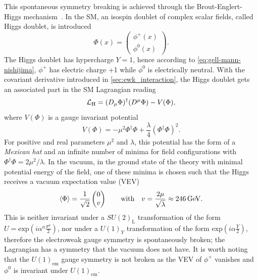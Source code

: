 This spontaneous symmetry breaking is achieved through the Brout-Englert-Higgs   mechanism~\cite{PhysRevLett.13.321,PhysRevLett.13.508,PhysRev.145.1156}. In the SM, an isospin doublet of complex scalar fields, called Higgs doublet, is introduced
\begin{equation}
	\Phi(x) = \begin{pmatrix}
		\phi^+(x) \\
		\phi^0(x)
	\end{pmatrix}.
\end{equation}
The Higgs doublet has hypercharge $Y=1$, hence according to \cref{eq:gell-mann-nishijima}, $\phi^+$ has electric charge +1 while $\phi^0$ is electrically neutral. With the covariant derivative introduced in \cref{sec:ewk_interaction}, the Higgs doublet gets an associated part in the SM Lagrangian reading
\begin{equation}
	\mathcal{L}_\mathrm{H} = (\mathop{}\!D_\mu\Phi)^\dagger(\mathop{}\!D^\mu\Phi) - V(\Phi),
\end{equation}
where $V(\Phi)$ is a gauge invariant potential
\begin{equation}
	V(\Phi) = -\mu^2\Phi^\dagger\Phi + \frac{\lambda}{4}(\Phi^\dagger\Phi)^2.
	\label{eq:higgs_potential}
\end{equation}
For positive and real parameters $\mu^2$ and $\lambda$, this potential has the form of a \textit{Mexican hat} and an infinite number of minima for field configurations with $\Phi^\dagger\Phi=2\mu^2/\lambda$. In the vacuum, \ie in the ground state of the theory with minimal potential energy of the field, one of these minima is chosen such that the Higgs  receives a vacuum expectation value (VEV)
\begin{equation}
	\braket{\Phi} = \frac{1}{\sqrt{2}}\begin{pmatrix}
		0 \\
		v
	\end{pmatrix} \qquad \textrm{with} \quad v = \frac{2\mu}{\sqrt{\lambda}} \approx \SI{246}{\GeV}.
	\label{eq:higgs_vev}
\end{equation}
This is neither invariant under a $SU(2)_\mathrm{L}$ transformation of the form $U = \mathrm{exp}(i\alpha^a\frac{\sigma^a}{2})$, nor under a $U(1)_Y$ transformation of the form $\mathrm{exp}(i\alpha\frac{Y}{2})$, therefore the electroweak gauge symmetry is spontaneously broken; the Lagrangian has a symmetry that the vacuum does not have. It is worth noting that the $U(1)_\mathrm{em}$ gauge symmetry is not broken as the VEV of $\phi^+$ vanishes and $\phi^0$ is invariant under $U(1)_\mathrm{em}$.

